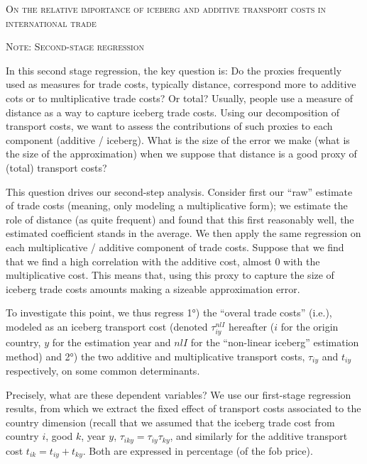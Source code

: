 \documentclass[a4paper,11pt]{article}
\begin{document}
\begin{center}

\textsc{On the relative importance of iceberg  and additive transport costs in international trade} \\ \vspace{1 cm}

\textsc{Note: Second-stage regression}

\end{center}


In this second stage regression, the key question is: Do the proxies frequently used as measures for trade costs, typically distance, correspond more to additive cots or to multiplicative trade costs? Or total? Usually, people use a measure of distance as a way to capture iceberg trade costs. Using our decomposition of transport costs, we want to assess the contributions of such proxies to each component (additive / iceberg). What is the size of the error we make (what is the size of the approximation) when we suppose that distance is a good proxy of (total) transport costs?

This question drives our second-step analysis. Consider first our ``raw'' estimate of trade costs (meaning, only modeling a multiplicative form); we estimate the role of distance (as quite frequent) and found that this first reasonably well, the estimated coefficient stands in the average. We then apply the same regression on each multiplicative / additive component of trade costs. Suppose that we find that we find a high correlation with the additive cost, almost 0 with the multiplicative cost. This means that, using this proxy to capture the size of iceberg trade costs amounts making a sizeable approximation error.

To investigate this point, we thus regress 1°) the ``overal trade costs'' (i.e.), modeled as an iceberg transport cost (denoted $\tau_{iy}^{nlI}$ hereafter ($i$ for the origin country, $y$ for the estimation year and $nlI$ for the ``non-linear iceberg'' estimation method) and 2°) the two additive and multiplicative transport costs, $\tau_{iy}$ and $t_{iy}$ respectively, on some common determinants. \medskip


Precisely, what are these dependent variables? We use our first-stage regression results, from which we extract the fixed effect of transport costs associated to the country dimension (recall that we assumed that the iceberg trade cost from country $i$, good $k$, year $y$, $\tau_{iky} = \tau_{iy}\tau_{ky}$, and  similarly for the additive transport cost $t_{ik} = t_{iy}+ t_{ky}$. Both are expressed in percentage (of the fob price).
\end{document}
